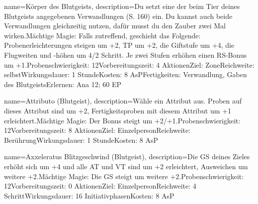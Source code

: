 {
    name={Körper des Blutgeists},
    description={Du setzt eine der beim Tier deines Blutgeists angegebenen Verwandlungen (S. 160) ein. Du kannst auch beide Verwandlungen gleichzeitig nutzen, dafür musst du den Zauber zwei Mal wirken.\newline Mächtige Magie: Falls zutreffend, geschieht das Folgende: Probenerleichterungen steigen um +2, TP um +2, die Giftstufe um +4, die Flugweiten und -höhen um 4/2 Schritt. Je zwei Stufen erhöhen einen RS-Bonus um +1.\newline Probenschwierigkeit: 12\newline Vorbereitungszeit: 4 Aktionen\newline Ziel: Zone\newline Reichweite: selbst\newline Wirkungsdauer: 1 Stunde\newline Kosten: 8 AsP\newline Fertigkeiten: Verwandlung, Gaben des Blutgeists\newline Erlernen: Ana 12; 60 EP}
}


{
    name={Attributo (Blutgeist)},
    description={Wähle ein Attribut aus. Proben auf dieses Attribut sind um +2, Fertigkeitsproben mit diesem Attribut um +1 erleichtert.\newline Mächtige Magie: Der Bonus steigt um +2/+1.\newline Probenschwierigkeit: 12\newline Vorbereitungszeit: 8 Aktionen\newline Ziel: Einzelperson\newline Reichweite: Berührung\newline Wirkungsdauer: 1 Stunde\newline Kosten: 8 AsP}
}


{
    name={Axxeleratus Blitzgeschwind (Blutgeist)},
    description={Die GS deines Zieles erhöht sich um +4 und alle AT und VT sind um +2 erleichtert, Ausweichen um weitere +2.\newline Mächtige Magie: Die GS steigt um weitere +2.\newline Probenschwierigkeit: 12\newline Vorbereitungszeit: 0 Aktionen\newline Ziel: Einzelperson\newline Reichweite: 4 Schritt\newline Wirkungsdauer: 16 Initiativphasen\newline Kosten: 8 AsP}
}


